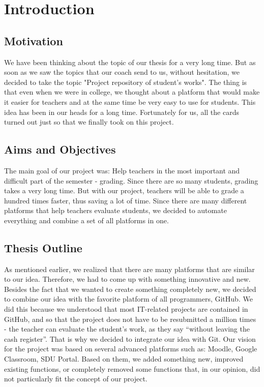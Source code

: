 \chapter{Introduction}\label{ch:intro}
\section{Motivation}
We have been thinking about the topic of our thesis for a very long time. But as soon as we saw the topics that our coach send to us, without hesitation, we decided to take the topic "Project repository of student’s works". The thing is that even when we were in college, we thought about a platform that would make it easier for teachers and at the same time be very easy to use for students. This idea has been in our heads for a long time. Fortunately for us, all the cards turned out just so that we finally took on this project.
\section{Aims and Objectives}
The main goal of our project was: Help teachers in the most important and difficult part of the semester - grading. Since there are so many students, grading takes a very long time. But with our project, teachers will be able to grade a hundred times faster, thus saving a lot of time. Since there are many different platforms that help teachers evaluate students, we decided to automate everything and combine a set of all platforms in one.
\section{Thesis Outline}
As mentioned earlier, we realized that there are many platforms that are similar to our idea. Therefore, we had to come up with something innovative and new. Besides the fact that we wanted to create something completely new, we decided to combine our idea with the favorite platform of all programmers, GitHub. We did this because we understood that most IT-related projects are contained in GitHub, and so that the project does not have to be resubmitted a million times - the teacher can evaluate the student’s work, as they say “without leaving the cash register”. That is why we decided to integrate our idea with Git. Our vision for the project was based on several advanced platforms such as: Moodle, Google Classroom, SDU Portal. Based on them, we added something new, improved existing functions, or completely removed some functions that, in our opinion, did not particularly fit the concept of our project.
